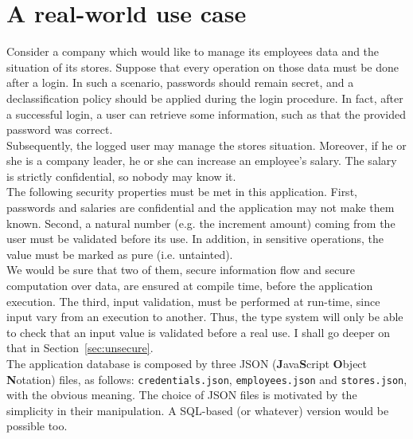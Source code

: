 \section{A real-world use case}\label{sec:example}
Consider a company which would like to manage its employees data and the situation of its stores. Suppose that every operation on those data must be done after a login. In such a scenario, passwords should remain secret, and a declassification policy should be applied during the login procedure. In fact, after a successful login, a user can retrieve some information, such as that the provided password was correct. \\
Subsequently, the logged user may manage the stores situation. Moreover, if he or she is a company leader, he or she can increase an employee's salary. The salary is strictly confidential, so nobody may know it. \\
The following security properties must be met in this application. First, passwords and salaries are confidential and the application may not make them known. Second, a natural number (e.g. the increment amount) coming from the user must be validated before its use. In addition, in sensitive operations, the value must be marked as pure (i.e. untainted). \\
We would be sure that two of them, secure information flow and secure computation over data, are ensured at compile time, before the application execution. The third, input validation, must be performed at run-time, since input vary from an execution to another. Thus, the type system will only be able to check that an input value is validated before a real use. I shall go deeper on that in Section~\ref{sec:unsecure}. \\
The application database is composed by three JSON (\textbf{J}ava\textbf{S}cript \textbf{O}bject \textbf{N}otation) files, as follows: \texttt{credentials.json}, \texttt{employees.json} and \texttt{stores.json}, with the obvious meaning. The choice of JSON files is motivated by the simplicity in their manipulation. A SQL-based (or whatever) version would be possible too.
